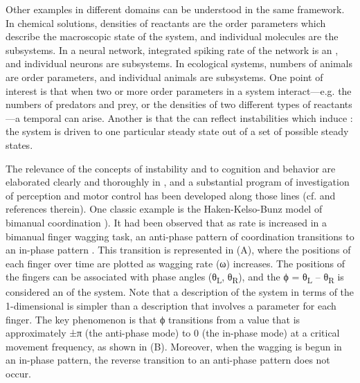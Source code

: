   Other examples in different domains can be understood in the same framework. In chemical solutions, densities of reactants are the order parameters which describe the macroscopic state of the system, and individual molecules are the subsystems. In a neural network, integrated spiking rate of the network is an , and individual neurons are subsystems. In ecological systems, numbers of animals are order parameters, and individual animals are subsystems. One point of interest is that when two or more order parameters in a system interact—e.g. the numbers of predators and prey, or the densities of two different types of reactants—a temporal  can arise. Another is that the  can reflect instabilities which induce : the system is driven to one particular steady state out of a set of possible steady states. 

The relevance of the concepts of instability and  to cognition and behavior are elaborated clearly and thoroughly in \citet{Kelso1997}, and a substantial program of investigation of perception and motor control has been developed along those lines (cf. \citet{Kelso1997} and references therein). One classic example is the Haken-Kelso-Bunz model of bimanual coordination \citep{HakenEtAl1985,SchonerKelso1988}). It had been observed that as rate is increased in a bimanual finger wagging task, an anti-phase pattern of coordination transitions to an in-phase pattern \citep{KelsoEtAl1981}. This transition is represented in {}(A), where the positions of each finger over time are plotted as wagging rate (ω) increases. The positions of the fingers can be associated with phase angles (θ\textsubscript{L}, θ\textsubscript{R}), and the  ϕ = θ\textsubscript{L} – θ\textsubscript{R} is considered an  of the system. Note that a description of the system in terms of the 1-dimensional  is simpler than a description that involves a  parameter for each finger. The key phenomenon is that ϕ transitions from a value that is approximately ±π (the anti-phase mode) to 0 (the in-phase mode) at a critical movement frequency, as shown in {}(B). Moreover, when the wagging is begun in an in-phase pattern, the reverse transition to an anti-phase pattern does not occur.

